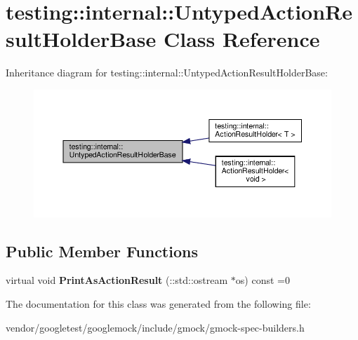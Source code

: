 \hypertarget{classtesting_1_1internal_1_1_untyped_action_result_holder_base}{}\section{testing\+:\+:internal\+:\+:Untyped\+Action\+Result\+Holder\+Base Class Reference}
\label{classtesting_1_1internal_1_1_untyped_action_result_holder_base}


Inheritance diagram for testing\+:\+:internal\+:\+:Untyped\+Action\+Result\+Holder\+Base\+:
\nopagebreak
\begin{figure}[H]
\begin{center}
\leavevmode
\includegraphics[width=350pt]{classtesting_1_1internal_1_1_untyped_action_result_holder_base__inherit__graph}
\end{center}
\end{figure}
\subsection*{Public Member Functions}
\begin{DoxyCompactItemize}
\item 
\mbox{\label{classtesting_1_1internal_1_1_untyped_action_result_holder_base_a4b4a558fcb1d3b02c0fec34f186d3b90}} 
virtual void {\bfseries Print\+As\+Action\+Result} (\+::std\+::ostream $\ast$os) const =0
\end{DoxyCompactItemize}


The documentation for this class was generated from the following file\+:\begin{DoxyCompactItemize}
\item 
vendor/googletest/googlemock/include/gmock/gmock-\/spec-\/builders.\+h\end{DoxyCompactItemize}
